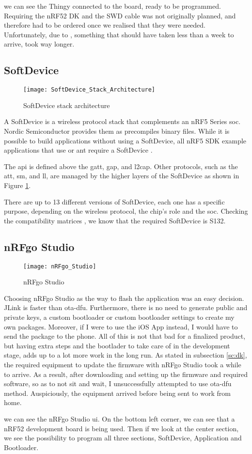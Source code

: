  we can see the Thingy connected to the board, ready to be programmed. Requiring the nRF52 DK and the SWD cable was not originally planned, and therefore had to be ordered once we realised that they were needed. Unfortunately, due to \cov, something that should have taken less than a week to arrive, took way longer.

\subsection{SoftDevice}
\begin{figure}[hbt!]
	\centering
	\texttt{[image: SoftDevice\_Stack\_Architecture]}
	\caption{SoftDevice stack architecture}
	\label{fig:softdevice_stack}
\end{figure}
A SoftDevice is a wireless protocol stack that complements an nRF5 Series \gls{soc}. Nordic Semiconductor provides them as precompiles binary files. While it is possible to build applications without using a SoftDevice, all nRF5 SDK example applications that use \bt or \gls{ant} require a SoftDevice \cite{SoftDevice}.

The \gls{api} is defined above the \gls{gatt}, \gls{gap}, and \gls{l2cap}. Other protocols, such as the \gls{att}, \gls{sm}, and \gls{ll}, are managed by the higher layers of the SoftDevice as shown in Figure  \ref{fig:softdevice_stack}.

There are up to 13 different versions of SoftDevice, each one has a specific purpose, depending on the wireless protocol, the chip's role and the \gls{soc}. Checking the compatibility matrices \cite{SoftDevice}, we know that the required SoftDevice is S132.

\subsection{nRFgo Studio}
\begin{figure}[hbt!]
	\centering
	\texttt{[image: nRFgo\_Studio]}
	\caption{nRFgo Studio}
	\label{fig:nrfgo_studio}
\end{figure}
Choosing nRFgo Studio as the way to flash the application was an easy decision. JLink is faster than \gls{ota-dfu}. Furthermore, there is no need to generate public and private keys, a custom bootloader or custom bootloader settings to create my own packages. Moreover, if I were to use the iOS App instead, I would have to send the package to the phone. All of this is not that bad for a finalized product, but having extra steps and the bootlader to take care of in the development stage, adds up to a lot more work in the long run. As stated in subsection \ref{sc:dk}, the required equipment to update the firmware with nRFgo Studio took a while to arrive. As a result, after downloading and setting up the firmware and required software, so as to not sit and wait, I unsuccessfully attempted to use \gls{ota-dfu} method. Auspiciously, the equipment arrived before being sent to work from home.

 we can see the nRFgo Studio \gls{ui}. On the bottom left corner, we can see that a nRF52 development board is being used. Then if we look at the center section, we see the possibility to program all three sections, SoftDevice, Application and Bootloader.